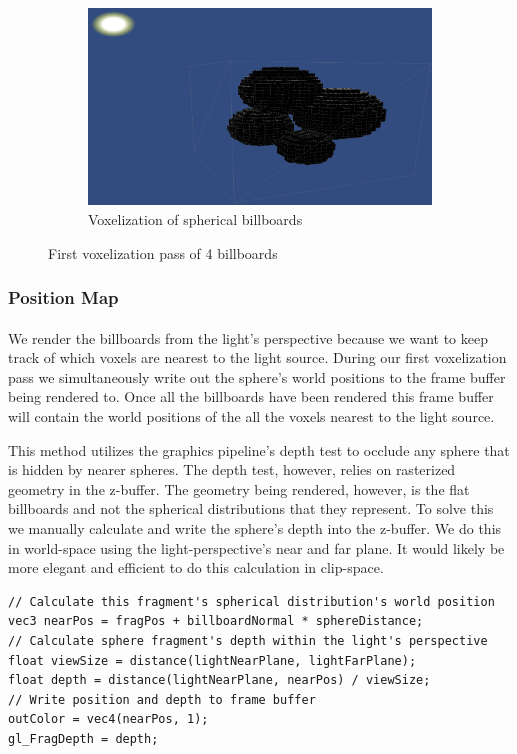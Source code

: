 \begin{figure}[t]
	~
	\begin{subfigure}[t]{0.48\textwidth}
	\includegraphics[width=\textwidth]{../res/voxelize1.png}
	\caption{Voxelization of spherical billboards}
	\end{subfigure}
\caption{First voxelization pass of 4 billboards}
\end{figure}

\newpage
\subsubsection{Position Map}\paragraph{}
We render the billboards from the light's perspective because we want to keep track of which voxels are nearest to the light source. 
During our first voxelization pass we simultaneously write out the sphere's world positions to the frame buffer being rendered to. Once all the billboards have been rendered this frame buffer will contain the world positions of the all the voxels nearest to the light source. 

This method utilizes the graphics pipeline's depth test to occlude any sphere that is hidden by nearer spheres.
The depth test, however, relies on rasterized geometry in the z-buffer.
The geometry being rendered, however, is the flat billboards and not the spherical distributions that they represent. 
To solve this we manually calculate and write the sphere's depth into the z-buffer. We do this in world-space using the light-perspective's near and far plane. It would likely be more elegant and efficient to do this calculation in clip-space.

\newpage %
\begin{lstlisting}[caption={first\_voxelize.glsl, 61}]
// Calculate this fragment's spherical distribution's world position 
vec3 nearPos = fragPos + billboardNormal * sphereDistance;
// Calculate sphere fragment's depth within the light's perspective
float viewSize = distance(lightNearPlane, lightFarPlane);
float depth = distance(lightNearPlane, nearPos) / viewSize;
// Write position and depth to frame buffer
outColor = vec4(nearPos, 1);
gl_FragDepth = depth;
\end{lstlisting}

